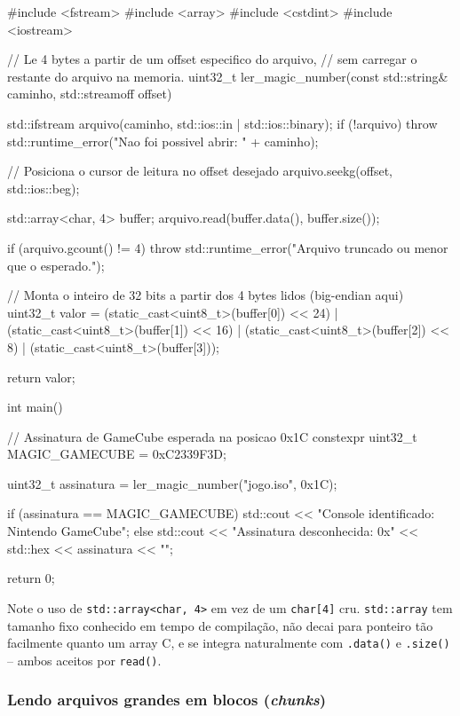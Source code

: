 \begin{CaixaCodigo}
#include <fstream>
#include <array>
#include <cstdint>
#include <iostream>

// Le 4 bytes a partir de um offset especifico do arquivo,
// sem carregar o restante do arquivo na memoria.
uint32_t ler_magic_number(const std::string& caminho, std::streamoff offset) {
    std::ifstream arquivo(caminho, std::ios::in | std::ios::binary);
    if (!arquivo) {
        throw std::runtime_error("Nao foi possivel abrir: " + caminho);
    }

    // Posiciona o cursor de leitura no offset desejado
    arquivo.seekg(offset, std::ios::beg);

    std::array<char, 4> buffer{};
    arquivo.read(buffer.data(), buffer.size());

    if (arquivo.gcount() != 4) {
        throw std::runtime_error("Arquivo truncado ou menor que o esperado.");
    }

    // Monta o inteiro de 32 bits a partir dos 4 bytes lidos (big-endian aqui)
    uint32_t valor =
        (static_cast<uint8_t>(buffer[0]) << 24) |
        (static_cast<uint8_t>(buffer[1]) << 16) |
        (static_cast<uint8_t>(buffer[2]) << 8)  |
        (static_cast<uint8_t>(buffer[3]));

    return valor;
}

int main() {
    // Assinatura de GameCube esperada na posicao 0x1C
    constexpr uint32_t MAGIC_GAMECUBE = 0xC2339F3D;

    uint32_t assinatura = ler_magic_number("jogo.iso", 0x1C);

    if (assinatura == MAGIC_GAMECUBE) {
        std::cout << "Console identificado: Nintendo GameCube\n";
    } else {
        std::cout << "Assinatura desconhecida: 0x" << std::hex << assinatura << "\n";
    }

    return 0;
}
\end{CaixaCodigo}

\begin{CaixaInfo}
Note o uso de \texttt{std::array<char, 4>} em vez de um \texttt{char[4]} cru. \texttt{std::array} tem tamanho fixo conhecido em tempo de compilação, não decai para ponteiro tão facilmente quanto um array C, e se integra naturalmente com \texttt{.data()} e \texttt{.size()} -- ambos aceitos por \texttt{read()}.
\end{CaixaInfo}

\subsubsection{Lendo arquivos grandes em blocos (\textit{chunks})}

